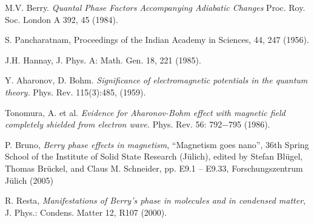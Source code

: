 \documentclass[%
 reprint,
 amsmath,amssymb,
 aps,
]{revtex4-1}
\begin{document}
\begin{thebibliography}{9}
M.V. Berry. \textit{Quantal Phase Factors Accompanying Adiabatic Changes} Proc. Roy. Soc. London A 392, 45 (1984).

S. Pancharatnam, Proceedings of the Indian Academy in Sciences, 44, 247 (1956).

J.H. Hannay, J. Phys. A: Math. Gen. 18, 221 (1985).

Y. Aharonov, D. Bohm. \textit{Signiﬁcance of electromagnetic potentials in the quantum theory.} Phys. Rev. 115(3):485, (1959).

Tonomura, A. et al. \textit{Evidence for Aharonov-Bohm effect with magnetic field completely shielded from electron wave.} Phys. Rev. 56: 792$-$795 (1986).

P. Bruno, \textit{Berry phase effects in magnetism}, “Magnetism goes nano”, 36th Spring School of the Institute of Solid State Research (Jülich), edited by Stefan Blügel, Thomas Brückel, and Claus M. Schneider, pp. E9.1 – E9.33, Forschungszentrum Jülich (2005)

 R. Resta, \textit{Manifestations of Berry’s phase in molecules and in condensed matter}, J. Phys.: Condens. Matter 12, R107 (2000).

\end{thebibliography}
\end{document}
